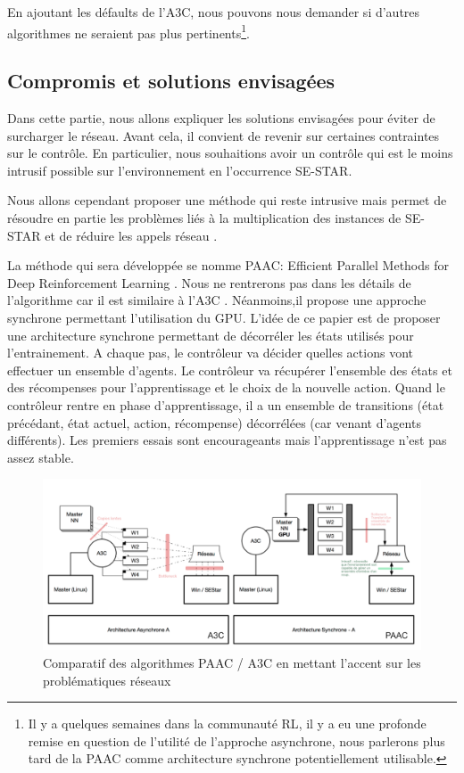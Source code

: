 En ajoutant les défaults de l'A3C, nous pouvons nous demander si d'autres algorithmes ne seraient pas plus pertinents\footnote{Il y a quelques semaines dans la communauté \gls{RL}, il y a eu une profonde remise en question de l'utilité de l'approche asynchrone, nous parlerons plus tard de la PAAC comme architecture synchrone potentiellement utilisable.}.

\subsection{Compromis et solutions envisagées}

Dans cette partie, nous allons expliquer les solutions envisagées pour éviter de surcharger le réseau. Avant cela, il convient de revenir sur certaines contraintes sur le contrôle. En particulier, nous souhaitions avoir un contrôle qui est le moins intrusif possible sur l'environnement en l'occurrence SE-STAR.

Nous allons cependant proposer une méthode qui reste intrusive mais permet de résoudre en partie les problèmes liés à la multiplication des instances de SE-STAR et de réduire les appels réseau . 

La méthode qui sera développée se nomme PAAC: Efficient Parallel Methods for Deep Reinforcement Learning \cite{2017arXiv170504862C}. Nous ne rentrerons pas dans les détails de l'algorithme car il est similaire à l'\gls{A3C} \cite{DBLP:journals/corr/MnihBMGLHSK16}. Néanmoins,il propose une approche synchrone permettant l'utilisation du GPU. L'idée de ce papier est de proposer une architecture synchrone permettant de décorréler les états utilisés pour l'entrainement. A chaque pas, le contrôleur va décider quelles actions vont effectuer un ensemble d'agents. Le contrôleur va récupérer l'ensemble des états et des récompenses pour l'apprentissage et le choix de la nouvelle action. Quand le contrôleur rentre en phase d'apprentissage, il a un ensemble de transitions (état précédant, état actuel, action, récompense) décorrélées (car venant d'agents différents). Les premiers essais sont encourageants mais l'apprentissage n'est pas assez stable.

\begin{figure}[h!]
\begin{center}
\includegraphics[scale=.4]{./assets/interfaceReseau/paaca3c}
\caption{Comparatif des algorithmes PAAC / A3C en mettant l'accent sur les problématiques réseaux}
\end{center}
\end{figure}

